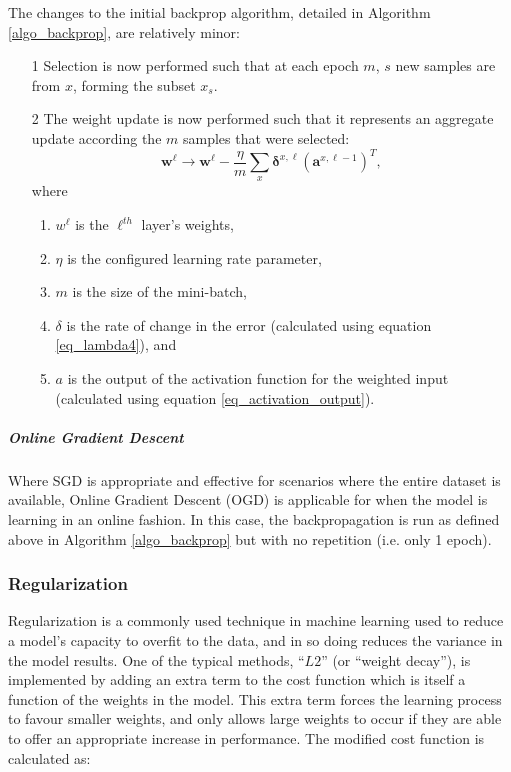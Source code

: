 \documentclass[a4paper,11pt,oneside]{article}
\theoremstyle{plain}
\theoremstyle{definition}
\begin{document}
	The changes to the initial backprop algorithm, detailed in Algorithm \ref{algo_backprop}, are relatively minor:
	\begin{itemize}
		\item [1] Selection is now performed such that at each epoch $m$, $s$ new samples are from $x$, forming the subset $x_s$.
		\item [2] The weight update is now performed such that it represents an aggregate update according the $m$ samples that were selected:
		\begin{equation}\label{eq_backprop_weightupdate_sgd}
		\mathbf{w}^\ell \rightarrow \mathbf{w}^\ell - \frac{\eta}{m} \sum_{x} \mathbf{\delta}^{x, \ell} (\mathbf{a}^{x, \ell - 1})^T , 
		\end{equation}
		where
		\begin{enumerate}
			\item $w^\ell$ is the $\ell^{th}$ layer's weights,
			\item $\eta$ is the configured learning rate parameter, 
			\item $m$ is the size of the mini-batch,
			\item $\delta$ is the rate of change in the error (calculated using equation \eqref{eq_lambda4}), and
			\item $a$ is the output of the activation function for the weighted input (calculated using equation \eqref{eq_activation_output}).
		\end{enumerate}
	\end{itemize}
	
	\subparagraph{Online Gradient Descent}
	Where SGD is appropriate and effective for scenarios where the entire dataset is available, Online Gradient Descent (OGD) is applicable for when the model is learning in an online fashion. In this case, the backpropagation is run as defined above in Algorithm \ref{algo_backprop} but with no repetition (i.e. only 1 epoch).
	
	\subsubsection{Regularization}\label{imp_regularization}
	
	Regularization is a commonly used technique in machine learning used to reduce a model's capacity to overfit to the data, and in so doing reduces the variance in the model results. One of the typical methods, ``$L2$'' (or ``weight decay''), is implemented by adding an extra term to the cost function which is itself a function of the weights in the model. This extra term forces the learning process to favour smaller weights, and only allows large weights to occur if they are able to offer an appropriate increase in performance. The modified cost function is calculated as:
	
\end{document}
